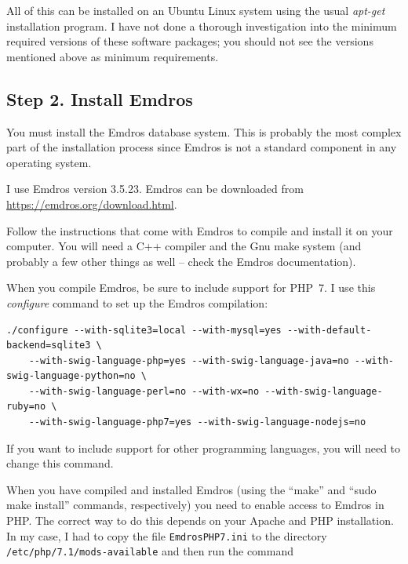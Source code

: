 \documentclass[11pt,oneside,a4paper]{memoir}
\begin{document}
All of this can be installed on an Ubuntu Linux system using the usual \emph{apt-get} installation
program. I have not done a thorough investigation into the minimum required versions of these
software packages; you should not see the versions mentioned above as minimum requirements.



\subsection{Step 2. Install Emdros}\label{sec-install-emdros}

You must install the Emdros database system. This is probably the most complex part of
the installation process since Emdros is not a standard component in any operating system.

I use Emdros version 3.5.23. Emdros can be downloaded from
\url{https://emdros.org/download.html}.

Follow the instructions that come with Emdros to compile and install it on your computer. You will
need a C++ compiler and the Gnu make%
system (and probably a few other things as well -- check the Emdros documentation).

When you compile Emdros, be sure to include support for PHP~7. I use this
\emph{configure} command to set up the Emdros compilation:

\begin{lstlisting}
./configure --with-sqlite3=local --with-mysql=yes --with-default-backend=sqlite3 \
    --with-swig-language-php=yes --with-swig-language-java=no --with-swig-language-python=no \
    --with-swig-language-perl=no --with-wx=no --with-swig-language-ruby=no \
    --with-swig-language-php7=yes --with-swig-language-nodejs=no
\end{lstlisting}

If you want to include support for other programming languages, you
will need to change this command.

When you have compiled and installed Emdros (using the ``make'' and ``sudo make install'' commands,
respectively) you need to enable access to Emdros in PHP. The correct way to do this depends on your
Apache and PHP installation. In my case, I had to copy the file
\texttt{EmdrosPHP7.ini} to the directory \texttt{/etc/php/7.1/mods-available} and then run the
command
\end{document}
